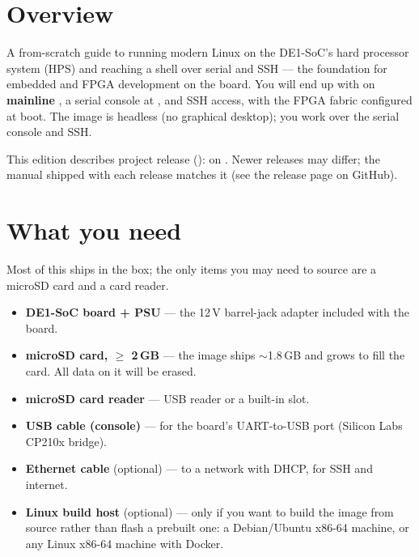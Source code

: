 \section*{Overview}
A from-scratch guide to running modern Linux on the DE1-SoC's hard processor
system (HPS) and reaching a shell over serial and SSH --- the foundation for
embedded and FPGA development on the board. You will end up with
\textbf{\ManualOS} on \textbf{mainline \ManualKernel}, a serial console at
, and SSH access, with the FPGA fabric configured at boot. The
image is headless (no graphical desktop); you work over the serial console and
SSH.

\begin{note}
This edition describes project release \textbf{\ManualRelease}
(\ManualReleaseDate): \ManualOS{} on \ManualKernel. Newer releases may differ;
the manual shipped with each release matches it (see the release page on
GitHub).
\end{note}

\section{What you need}
Most of this ships in the box; the only items you may need to source are a
microSD card and a card reader.

\begin{itemize}
  \item \textbf{DE1-SoC board + PSU} --- the 12\,V barrel-jack adapter included with the board.
  \item \textbf{microSD card, $\geq$ 2\,GB} --- the image ships $\sim$1.8\,GB and grows to fill the card. All data on it will be erased.
  \item \textbf{microSD card reader} --- USB reader or a built-in slot.
  \item \textbf{USB cable (console)} --- for the board's UART-to-USB port (Silicon Labs CP210x bridge).
  \item \textbf{Ethernet cable} (optional) --- to a network with DHCP, for SSH and internet.
  \item \textbf{Linux build host} (optional) --- only if you want to build the image from source rather than flash a prebuilt one: a Debian/Ubuntu x86-64 machine, or any Linux x86-64 machine with Docker.
\end{itemize}

